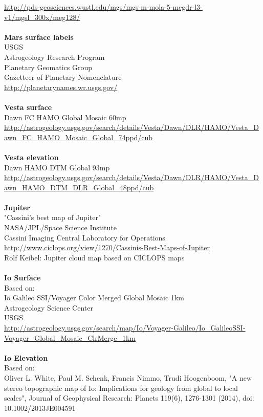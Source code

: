 \documentclass[Orbiter User Manual.tex]{subfiles}
\begin{document}
\url{http://pds-geosciences.wustl.edu/mgs/mgs-m-mola-5-megdr-l3-v1/mgsl_300x/meg128/}\\
\\
\textbf{Mars surface labels}\\
USGS\\
Astrogeology Research Program\\
Planetary Geomatics Group\\
Gazetteer of Planetary Nomenclature\\
\url{http://planetarynames.wr.usgs.gov/}\\
\\
\textbf{Vesta surface}\\
Dawn FC HAMO Global Mosaic 60mp\\
\url{http://astrogeology.usgs.gov/search/details/Vesta/Dawn/DLR/HAMO/Vesta_Dawn_FC_HAMO_Mosaic_Global_74ppd/cub}\\
\\
\textbf{Vesta elevation}\\
Dawn HAMO DTM Global 93mp\\
\url{http://astrogeology.usgs.gov/search/details/Vesta/Dawn/DLR/HAMO/Vesta_Dawn_HAMO_DTM_DLR_Global_48ppd/cub}\\
\\
\textbf{Jupiter}\\
"Cassini's best map of Jupiter"\\
NASA/JPL/Space Science Institute\\
Cassini Imaging Central Laboratory for Operations\\
\url{http://www.ciclops.org/view/1270/Cassinis-Best-Maps-of-Jupiter}\\
Rolf Keibel: Jupiter cloud map based on CICLOPS maps\\
\\
\textbf{Io Surface}\\
Based on:\\
Io Galileo SSI/Voyager Color Merged Global Mosaic 1km\\
Astrogeology Science Center\\
USGS\\
\url{http://astrogeology.usgs.gov/search/map/Io/Voyager-Galileo/Io_GalileoSSI-Voyager_Global_Mosaic_ClrMerge_1km}\\
\\
\textbf{Io Elevation}\\
Based on:\\
Oliver L. White, Paul M. Schenk, Francis Nimmo, Trudi Hoogenboom, "A new stereo topographic map of Io: Implications for geology from global to local scales", Journal of Geophysical Research: Planets 119(6), 1276-1301 (2014), doi: 10.1002/2013JE004591\\
\end{document}
